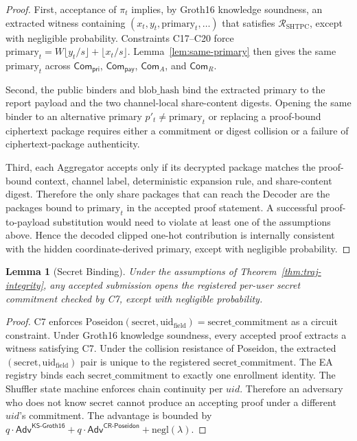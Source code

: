 \documentclass[journal]{IEEEtran}
\theoremstyle{definition}
\theoremstyle{plain}
\newtheorem{lemma}{Lemma}
\begin{document}
\begin{proof}
  First, acceptance of \(\pi_t\) implies, by Groth16 knowledge soundness, an
  extracted witness containing \((x_t,y_t,\mathrm{primary}_t,\ldots)\) that
  satisfies \(\mathcal{R}_{\mathrm{SHTPC}}\), except with negligible
  probability. Constraints C17--C20 force
  \(\mathrm{primary}_t=W\lfloor y_t/s\rfloor+\lfloor x_t/s\rfloor\).
  Lemma~\ref{lem:same-primary} then gives the same \(\mathrm{primary}_t\) across
  \(\mathsf{Com}_{\mathsf{pri}}\), \(\mathsf{Com}_{\mathsf{pay}}\),
  \(\mathsf{Com}_{A}\), and \(\mathsf{Com}_{R}\).

  Second, the public binders and \(\mathrm{blob\_hash}\) bind the extracted
  primary to the report payload and the two channel-local share-content digests.
  Opening the same binder to an alternative primary \(p'_t\ne\mathrm{primary}_t\)
  or replacing a proof-bound ciphertext package requires either a commitment or
  digest collision or a failure of ciphertext-package authenticity.

  Third, each Aggregator accepts only if its decrypted package matches the
  proof-bound context, channel label, deterministic expansion rule, and
  share-content digest. Therefore the only share packages that can reach the
  Decoder are the packages bound to \(\mathrm{primary}_t\) in the accepted proof
  statement. A successful proof-to-payload substitution would need to violate at
  least one of the assumptions above. Hence the decoded clipped one-hot
  contribution is internally consistent with the hidden coordinate-derived
  primary, except with negligible probability.
\end{proof}

\begin{lemma}[Secret Binding]
  \label{lem:secret-binding}
  Under the assumptions of Theorem~\ref{thm:traj-integrity}, any accepted
  submission opens the registered per-user secret commitment checked by C7,
  except with negligible probability.
\end{lemma}

\begin{proof}
  C7 enforces $\mathrm{Poseidon}(\mathrm{secret},\mathrm{uid}_{\mathrm{field}})=
  \mathrm{secret\_commitment}$ as a circuit constraint. Under Groth16 knowledge
  soundness, every accepted proof extracts a witness satisfying C7. Under the
  collision resistance of Poseidon, the extracted $(\mathrm{secret},
  \mathrm{uid}_{\mathrm{field}})$ pair is unique to the registered
  $\mathrm{secret\_commitment}$. The EA registry binds each
  $\mathrm{secret\_commitment}$ to exactly one enrollment identity. The Shuffler
  state machine enforces chain continuity per $uid$. Therefore an adversary who
  does not know $\mathrm{secret}$ cannot produce an accepting proof under a
  different $uid$'s commitment. The advantage is bounded by
  $q\cdot\mathsf{Adv}^{\mathsf{KS\text{-}Groth16}}+
  q\cdot\mathsf{Adv}^{\mathsf{CR\text{-}Poseidon}}+\mathrm{negl}(\lambda)$.
\end{proof}
\end{document}
